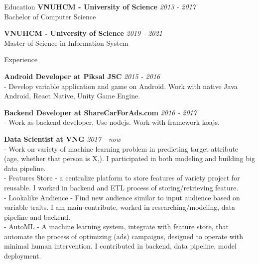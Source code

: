 \documentclass{resume} %
\begin{document}

\begin{rSection}{Education}
{\bf VNUHCM - University of Science} \hfill {\em 2013 - 2017 } 
\\ Bachelor of Computer Science %

{\bf VNUHCM - University of Science} \hfill {\em 2019 - 2021 } 
\\ Master of Science in Information System %


\end{rSection}
\begin{rSection}{Experience}

{\bf Android Developer at Piksal JSC} \hfill {\em 2015 - 2016}\\
- Develop variable application and game on Android. Work with native Java Android, React Native, Unity Game Engine. 

{\bf Backend Developer at ShareCarForAds.com} \hfill {\em 2016 - 2017}\\
- Work as backend developer. Use nodejs. Work with framework koajs.

{\bf Data Scientist at VNG } \hfill {\em 2017 - now}
\\ - Work on variety of machine learning problem in predicting target attribute (age, whether that person is X,). I participated in both modeling and building big data pipeline. 
\\ - Features Store - a centralize platform to store features of variety project for reusable. I worked in backend and ETL process of storing/retrieving feature. 
\\ - Lookalike Audience - Find new audience similar to input audience based on variable traits. I am main contribute, worked in researching/modeling, data pipeline and backend. 
\\ - AutoML - A machine learning system, integrate with feature store, that automate the process of optimizing (ads) campaigns, designed to operate with minimal human intervention. I contributed in backend, data pipeline, model deployment.

\end{rSection}
\end{document}
